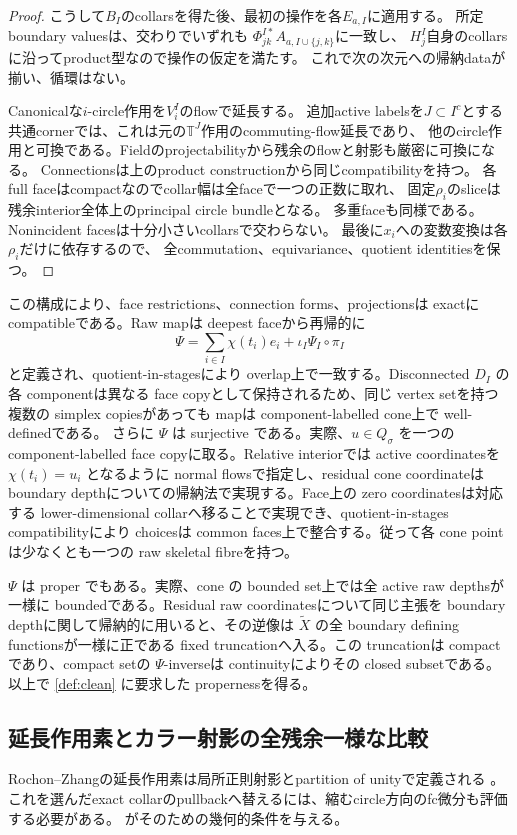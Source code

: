 \documentclass[11pt,a4paper]{ltjsarticle}
\theoremstyle{plain}
\theoremstyle{definition}
\theoremstyle{remark}
\begin{document}
\begin{proof}
こうして$B_I$のcollarsを得た後、最初の操作を各$E_{a,I}$に適用する。
所定boundary valuesは、交わりでいずれも
$\Phi_{jk}^{I*}A_{a,I\cup\{j,k\}}$に一致し、
$H_j^I$自身のcollarsに沿ってproduct型なので操作の仮定を満たす。
これで次の次元への帰納dataが揃い、循環はない。

Canonicalな$i$-circle作用を$V_i^I$のflowで延長する。
追加active labelsを$J\subset I^c$とする共通cornerでは、これは元の$\mathbb T^J$作用のcommuting-flow延長であり、
他のcircle作用と可換である。Fieldのprojectabilityから残余のflowと射影も厳密に可換になる。
Connectionsは上のproduct constructionから同じcompatibilityを持つ。
各full faceはcompactなのでcollar幅は全faceで一つの正数に取れ、
固定$\rho_i$のsliceは残余interior全体上のprincipal circle bundleとなる。
多重faceも同様である。Nonincident facesは十分小さいcollarsで交わらない。
最後に$x_i$への変数変換は各$\rho_i$だけに依存するので、
全commutation、equivariance、quotient identitiesを保つ。
\end{proof}


この構成により、face restrictions、connection forms、projectionsは exactに compatibleである。Raw mapは deepest faceから再帰的に
\[
 \Psi=\sum_{i\in I}\chi(t_i)e_i+\iota_I\Psi_I\circ\pi_I
\]
と定義され、quotient-in-stagesにより overlap上で一致する。Disconnected $D_I$ の各 componentは異なる face copyとして保持されるため、同じ vertex setを持つ複数の simplex copiesがあっても mapは component-labelled cone上で well-definedである。
さらに $\Psi$ は surjective である。実際、$u\in Q_\sigma$ を一つの component-labelled face copyに取る。Relative interiorでは active coordinatesを $\chi(t_i)=u_i$ となるように normal flowsで指定し、residual cone coordinateは boundary depthについての帰納法で実現する。Face上の zero coordinatesは対応する lower-dimensional collarへ移ることで実現でき、quotient-in-stages compatibilityにより choicesは common faces上で整合する。従って各 cone pointは少なくとも一つの raw skeletal fibreを持つ。

$\Psi$ は proper でもある。実際、cone の bounded set上では全 active raw depthsが一様に boundedである。Residual raw coordinatesについて同じ主張を boundary depthに関して帰納的に用いると、その逆像は $\widetilde X$ の全 boundary defining functionsが一様に正である fixed truncationへ入る。この truncationは compactであり、compact setの $\Psi$-inverseは continuityによりその closed subsetである。以上で \cref{def:clean} に要求した propernessを得る。

\subsection{延長作用素とカラー射影の全残余一様な比較}
Rochon--Zhangの延長作用素は局所正則射影とpartition of unityで定義される
\cite[(2.43)--(2.46), (5.10)]{RochonZhang}。
これを選んだexact collarのpullbackへ替えるには、縮むcircle方向のfc微分も評価する必要がある。
がそのための幾何的条件を与える。
\end{document}
